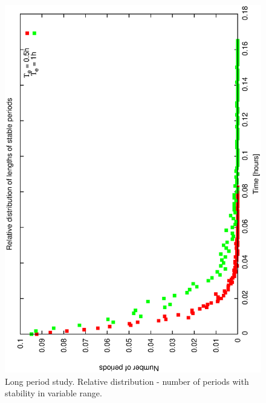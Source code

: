 \begin{figure}[h]
\begin{center}
 \includegraphics[scale=0.5, angle=-90]{figures/e_relstats.eps}
 \caption[Environmental scenario - relative distribution of stable period lengths.] 
   {Long period study. Relative distribution - number of periods with stability in variable range.}
\end{center} 
\label{fig:env_relstats}
\end{figure}

